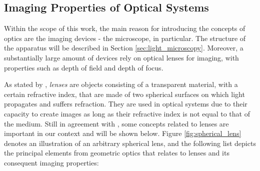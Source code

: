 \subsection{Imaging Properties of Optical Systems}

Within the scope of this work, the main reason for introducing the concepts of optics are the imaging devices - the microscope, in particular. The structure of the apparatus will be described in Section \ref{sec:light_microscopy}. Moreover, a substantially large amount of devices rely on optical lenses for imaging, with properties such as depth of field and depth of focus.

As stated by , \emph{lenses} are objects consisting of a transparent material, with a certain refractive index, that are made of two spherical surfaces on which light propagates and suffers refraction. They are used in optical systems due to their capacity to create images as long as their refractive index is not equal to that of the medium. Still in agreement with , some concepts related to lenses are important in our context and will be shown below. Figure \ref{fig:spherical_lens} denotes an illustration of an arbitrary spherical lens, and the following list depicts the principal elements from geometric optics that relates to lenses and its consequent imaging properties:

